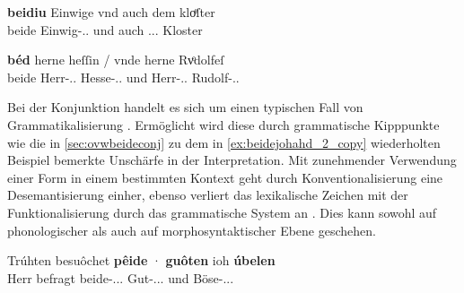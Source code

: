 \begin{exe}
\ex \label{ex:caoconjbeide}
	\begin{xlist}
	\ex \label{ex:caoconjbeide_1}
		\gll \textbf{beidiu} Einwige vnd auch dem kloͤſter \\
				beide Einwig-\Dat.\Sg.\FemF{} und auch \Def.\Dat.\Sg.\NeutM{}
					Kloster \\
		\begin{taggedline}{\parencites(Landshut, 1298)[\pno~2925, 219.34]{cao4}}
		\trans {}
		\end{taggedline}

	\ex \label{ex:caoconjbeide_2}
		\gll \textbf{béd} herne heſſin / vnde herne Rvͦdolfeſ \\
			beide Herr-\Gen.\Sg.\MascM{} Hesse-\Obl.\Sg.\MascM{} {} und
				Herr-\Gen.\Sg.\MascM{} Rudolf-\Gen.\Sg.\MascM{} \\
		\begin{taggedline}{\parencites(Freiburg i.\,Br., 1290)[\pno~1318, 561.11--12]{cao2}}
		\trans {}
		\end{taggedline}
	\end{xlist}
\end{exe}

Bei der Konjunktion  handelt es sich um einen typischen Fall von
Grammatikalisierung \autocite[vgl.][134--188]{lehmann2015}. Ermöglicht wird
diese durch grammatische Kipppunkte wie die in \cref{sec:ovwbeideconj} zu dem
in \cref{ex:beidejohahd_2_copy} wiederholten Beispiel bemerkte Unschärfe in der
Interpretation. Mit zunehmender Verwendung einer Form in einem bestimmten
Kontext geht durch Konventionalisierung eine Desemantisierung einher, ebenso
verliert das lexikalische Zeichen mit der Funktionalisierung durch das
grammatische System an . Dies kann sowohl auf phonologischer als
auch auf morphosyntaktischer Ebene geschehen.

\begin{exe}
\ex \label{ex:beidejohahd_2_copy}
	\gll Trúhten besuôchet \textbf{pêide} · \textbf{guôten} ioh
			\textbf{úbelen} \\
		Herr befragt beide-\Acc.\Pl.\MascM.\St{} {}
			Gut-\Acc.\Sg.\MascM.\Wk{} und Böse-\Acc.\Sg.\MascM.\Wk{} \\
	\begin{taggedline}{\parencites(11.~Jh.)[Notker, Psalmen 10, 34--36: 395--401]{ddd}} %
	\trans {}
	\end{taggedline}
\end{exe}

